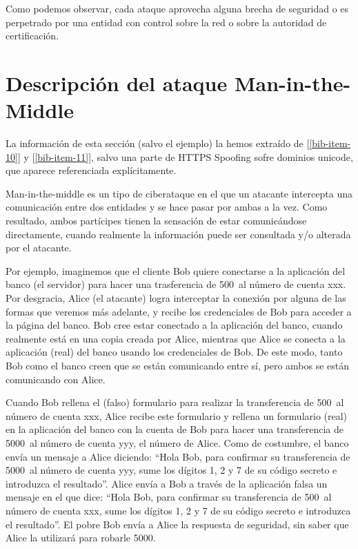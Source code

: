 \documentclass[11pt]{article}
\begin{document}
Como podemos observar, cada ataque aprovecha alguna brecha de seguridad o es perpetrado por una entidad con control sobre la red o sobre la autoridad
de certificación.

\section{Descripción del ataque Man-in-the-Middle}

La información de esta sección (salvo el ejemplo) la hemos extraído de [\ref{bib-item-10}] y [\ref{bib-item-11}], salvo
una parte de HTTPS Spoofing sofre dominios unicode, que aparece referenciada explícitamente.

Man-in-the-middle es un tipo de ciberataque en el que un atacante intercepta una comunicación entre dos entidades y se hace pasar por ambas a la vez.
Como resultado, ambos partícipes tienen la sensación de estar comunicándose directamente, cuando realmente la información puede ser
consultada y/o alterada por el atacante. 

Por ejemplo, imaginemos que el cliente Bob quiere conectarse a la aplicación del banco (el servidor) para hacer una trasferencia de 500\EUR \ al número de cuenta
xxx. Por desgracia, Alice (el atacante) logra interceptar la conexión por alguna de las formas que veremos más adelante, y recibe los credenciales de Bob para
acceder a la página del banco. Bob cree estar conectado a la aplicación del banco, cuando realmente está en una copia creada por Alice, mientras
que Alice se conecta a la aplicación (real) del banco usando los credenciales de Bob. De este modo, tanto Bob como el banco creen que se están
comunicando entre sí, pero ambos se están comunicando con Alice.

Cuando Bob rellena el (falso) formulario para realizar la transferencia de 500\EUR \ al número de cuenta xxx, Alice recibe este formulario y
rellena un formulario (real) en la aplicación del banco con la cuenta de Bob para hacer una transferencia de 5000\EUR \ al número de cuenta yyy,
el número de Alice. Como de costumbre, el banco envía un mensaje a Alice diciendo: ``Hola Bob, para confirmar su transferencia de 5000\EUR \ al número
 de cuenta yyy, sume los dígitos 1, 2 y 7 de su código secreto e introduzca el resultado''. Alice envía a Bob a través de la aplicación falsa
 un mensaje en el que dice:
 ``Hola Bob, para confirmar su transferencia de 500\EUR \ al número
 de cuenta xxx, sume los dígitos 1, 2 y 7 de su código secreto e introduzca el resultado''. El pobre Bob envía a Alice la respuesta de seguridad,
 sin saber que Alice la utilizará para robarle 5000\EUR. 
 
\end{document}
